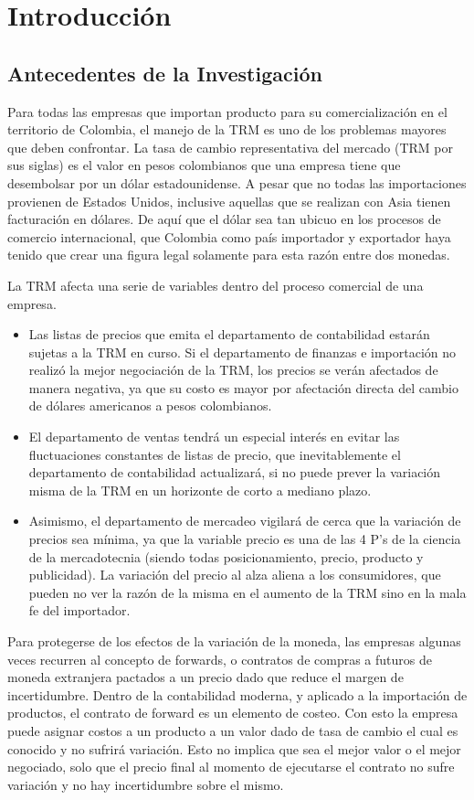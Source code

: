 \documentclass[letterpaper, spanish, 11pt]{report}
\begin{document}
\chapter{Introducción}

\section{Antecedentes de la Investigación}
Para todas las empresas que importan producto para su comercialización en el territorio de Colombia, el manejo de la TRM es uno de los problemas mayores que deben confrontar. La tasa de cambio representativa del mercado (TRM por sus siglas) es el valor en pesos colombianos que una empresa tiene que desembolsar por un dólar estadounidense. A pesar que no todas las importaciones provienen de Estados Unidos, inclusive aquellas que se realizan con Asia tienen facturación en dólares. De aquí que el dólar sea tan ubicuo en los procesos de comercio internacional, que Colombia como país importador y exportador haya tenido que crear una figura legal solamente para esta razón entre dos monedas. 

La TRM afecta una serie de variables dentro del proceso comercial de una empresa. 

\begin{itemize}
	\item Las listas de precios que emita el departamento de contabilidad estarán sujetas a la TRM en curso. Si el departamento de finanzas e importación no realizó la mejor negociación de la TRM, los precios se verán afectados de manera negativa, ya que su costo es mayor por afectación directa del cambio de dólares americanos a pesos colombianos.
	\item El departamento de ventas tendrá un especial interés en evitar las fluctuaciones constantes de listas de precio, que inevitablemente el departamento de contabilidad actualizará, si no puede prever la variación misma de la TRM en un horizonte de corto a mediano plazo. 
	\item Asimismo, el departamento de mercadeo vigilará de cerca que la variación de precios sea mínima, ya que la variable precio es una de las 4 P’s de la ciencia de la mercadotecnia (siendo todas posicionamiento, precio, producto y publicidad). La variación del precio al alza aliena a los consumidores, que pueden no ver la razón de la misma en el aumento de la TRM sino en la mala fe del importador. 	
\end{itemize}

Para protegerse de los efectos de la variación de la moneda, las empresas algunas veces recurren al concepto de forwards, o contratos de compras a futuros de moneda extranjera pactados a un precio dado que reduce el margen de incertidumbre. Dentro de la contabilidad moderna, y aplicado a la importación de productos, el contrato de forward es un elemento de costeo. Con esto la empresa puede asignar costos a un producto a un valor dado de tasa de cambio el cual es conocido y no sufrirá variación. Esto no implica que sea el mejor valor o el mejor negociado, solo que el precio final al momento de ejecutarse el contrato no sufre variación y no hay incertidumbre sobre el mismo. 
\end{document}
